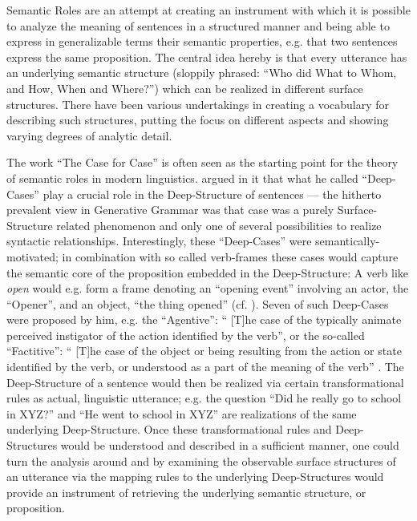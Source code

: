 Semantic Roles are an attempt at creating an instrument with which it is possible to analyze the
meaning of sentences in a structured manner and being able to express in generalizable terms
their semantic properties, e.g. that two sentences express the same proposition. The central idea
hereby is that every utterance has an underlying semantic structure
(sloppily phrased: ``Who did What to Whom, and How, When and Where?'') which can be realized in
different surface structures. There have been various undertakings in creating a vocabulary for
describing such structures, putting the focus on different aspects and showing varying degrees of
{\color{red} analytic detail}.

The work ``The Case for Case'' \citep{fillmore1967case} is often seen as the starting point
for the theory of semantic roles in modern linguistics. \citeauthor{fillmore1967case}
argued in it that what he called ``Deep-Cases'' play a crucial role in the Deep-Structure
of sentences --- the hitherto prevalent view in Generative Grammar was that case was a
purely Surface-Structure related phenomenon and only one of several possibilities to realize
syntactic relationships. Interestingly, these ``Deep-Cases'' were semantically-motivated; in
combination with so called verb-frames these cases would capture the semantic core of the
proposition embedded in the Deep-Structure: A verb like \emph{open} would e.g. form a frame
denoting an ``opening event'' involving an actor, the ``Opener'', and an object, ``the thing
opened'' (cf. \cite[p.~46f.]{fillmore1967case}). Seven of such Deep-Cases were proposed by
him, e.g. the ``Agentive'': `` [T]he case of the typically animate perceived instigator of
the action identified by the verb'', or the so-called ``Factitive'': `` [T]he case of the
object or being resulting from the action or state identified by the verb, or understood as
a part of the meaning of the verb'' \citep[p.~46]{fillmore1967case}. The Deep-Structure of
a sentence would then be realized via certain transformational rules as actual, linguistic
utterance; e.g. the question ``Did he really go to school in XYZ?'' and ``He went to school
in XYZ'' are realizations of the same underlying Deep-Structure. Once these transformational
rules and Deep-Structures would be understood and described in a sufficient manner, one could
turn the analysis around and by examining the observable surface structures of an utterance
via the mapping rules to the underlying Deep-Structures would provide an instrument of
retrieving the underlying semantic structure, or proposition.

